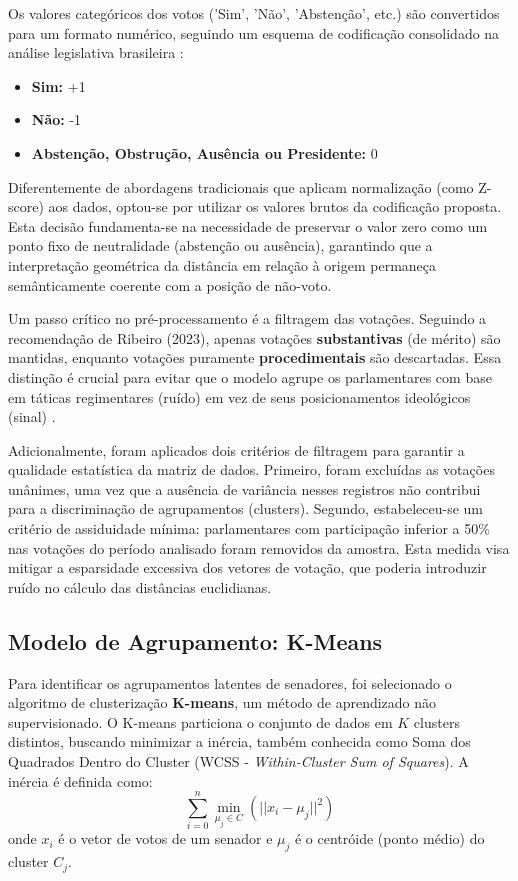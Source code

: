 \documentclass[conference]{IEEEtran}
\begin{document}
Os valores categóricos dos votos ('Sim', 'Não', 'Abstenção', etc.) são convertidos para um formato numérico, seguindo um esquema de codificação consolidado na análise legislativa brasileira \cite{leite2016}:
\begin{itemize}
    \item \textbf{Sim:} +1
    \item \textbf{Não:} -1
    \item \textbf{Abstenção, Obstrução, Ausência ou Presidente:} 0
\end{itemize}

Diferentemente de abordagens tradicionais que aplicam normalização (como Z-score) aos dados, optou-se por utilizar os valores brutos da codificação proposta. Esta decisão fundamenta-se na necessidade de preservar o valor zero como um ponto fixo de neutralidade (abstenção ou ausência), garantindo que a interpretação geométrica da distância em relação à origem permaneça semânticamente coerente com a posição de não-voto.

Um passo crítico no pré-processamento é a filtragem das votações. Seguindo a recomendação de Ribeiro (2023), apenas votações \textbf{substantivas} (de mérito) são mantidas, enquanto votações puramente \textbf{procedimentais} são descartadas. Essa distinção é crucial para evitar que o modelo agrupe os parlamentares com base em táticas regimentares (ruído) em vez de seus posicionamentos ideológicos (sinal) \cite{ribeiro2023}.

Adicionalmente, foram aplicados dois critérios de filtragem para garantir a qualidade estatística da matriz de dados. Primeiro, foram excluídas as votações unânimes, uma vez que a ausência de variância nesses registros não contribui para a discriminação de agrupamentos (clusters). Segundo, estabeleceu-se um critério de assiduidade mínima: parlamentares com participação inferior a 50\% nas votações do período analisado foram removidos da amostra. Esta medida visa mitigar a esparsidade excessiva dos vetores de votação, que poderia introduzir ruído no cálculo das distâncias euclidianas.

\subsection{Modelo de Agrupamento: K-Means}
Para identificar os agrupamentos latentes de senadores, foi selecionado o algoritmo de clusterização \textbf{K-means}, um método de aprendizado não supervisionado. O K-means particiona o conjunto de dados em $K$ clusters distintos, buscando minimizar a inércia, também conhecida como Soma dos Quadrados Dentro do Cluster (WCSS - \textit{Within-Cluster Sum of Squares}). A inércia é definida como:
$$\sum_{i=0}^{n} \min_{\mu_j \in C} (||x_i - \mu_j||^2)$$
onde $x_i$ é o vetor de votos de um senador e $\mu_j$ é o centróide (ponto médio) do cluster $C_j$.
\end{document}
